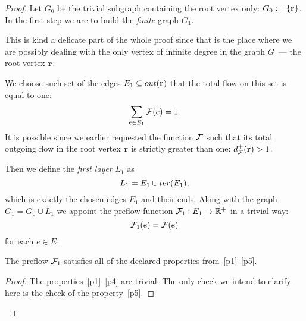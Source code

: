 \documentclass[12pt]{article}
\begin{document}
\begin{proof}
      Let $G_0$ be the trivial subgraph containing the root vertex only: $G_0 := \left\{\mathbf{r}\right\}$.
      In the first step we are to build the \emph{finite} graph $G_1$.
      \begin{note}
        This is kind a delicate part of the whole proof since that is the place where
          we are possibly dealing with the only vertex of infinite degree in the graph $G$~--- the root vertex $\mathbf{r}$.
      \end{note}
      We choose such set of the edges $E_1 \subseteq out(\mathbf{r})$ that the total flow on this set is equal to one:
      \[
        \sum_{e \in E_1} \mathcal{F}(e) = 1.
      \]
      It is possible since we earlier requested the function $\mathcal{F}$ such that its total outgoing flow in the root vertex
        $\mathbf{r}$ is strictly greater than one: $d^{+}_{\mathcal{F}}(\mathbf{r}) > 1$.

      Then we define the \emph{first layer} $L_1$ as
      \[
        L_1 = E_1 \cup ter(E_1),
      \]
        which is exactly the chosen edges $E_1$ and their ends.
      Along with the graph $G_1 = G_0 \cup L_1$ we appoint the preflow function $\mathcal{F}_{1}: E_1 \to \mathbb{R}^{+}$ in a trivial way:
      \[
        \mathcal{F}_{1}(e) = \mathcal{F}(e)
      \]
        for each $e \in E_1$.
      \begin{prop}
        The preflow $\mathcal{F}_{1}$ satisfies all of the declared properties from~\ref{p1}--\ref{p5}.
      \end{prop}
      \begin{proof}
        The properties~\ref{p1}--\ref{p4} are trivial.
        The only check we intend to clarify here is the check of the property~\ref{p5}.


\end{proof}
\end{proof}
\end{document}
